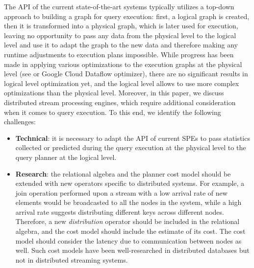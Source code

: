 The API of the current state-of-the-art systems typically utilizes a top-down approach to building a graph for query execution: first, a logical graph is created, then it is transformed into a physical graph, which is later used for execution, leaving no opportunity to pass any data from the physical level to the logical level and use it to adapt the graph to the new data and therefore making any runtime adjustments to execution plans impossible. While progress has been made in applying various optimizations to the execution graphs at the physical level (see \cite{grulich2020grizzly} or Google Cloud Dataflow optimizer), there are no significant results in logical level optimization yet, and the logical level allows to use more complex optimizations than the physical level. Moreover, in this paper, we discuss distributed stream processing engines, which require additional consideration when it comes to query execution. To this end, we identify the following challenges:

\begin{itemize}
    \item \textbf{Technical}: it is necessary to adapt the API of current SPEs to pass statistics collected or predicted during the query execution at the physical level to the query planner at the logical level.
    \item \textbf{Research}: the relational algebra and the planner cost model should be extended with new operators specific to distributed systems. For example, a join operation performed upon a stream with a low arrival rate of new elements would be broadcasted to all the nodes in the system, while a high arrival rate suggests distributing different keys across different nodes. Therefore, a new \textit{distribution} operator should be included in the relational algebra, and the cost model should include the estimate of its cost. The cost model should consider the latency due to communication between nodes as well. Such cost models have been well-researched in distributed databases \cite{kossmann2000thestate} but not in distributed streaming systems.
\end{itemize}




